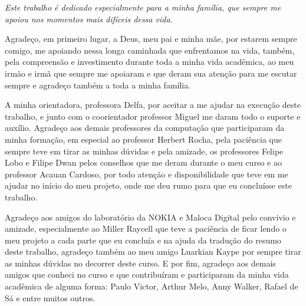 \documentclass[
	12pt,				%
    oneside,			%
	a4paper,			%
	chapter=TITLE,		%
	english,			%
	brazil				%
	]{abntex2}
\begin{document}
\frenchspacing 


\imprimircapa

\imprimirfolhaderosto

\imprimirfolhadeaprovacao
\begin{dedicatoria}
   \vspace*{\fill}
   \centering
   \noindent
   \textit{Este trabalho é dedicado especialmente para a minha família, que sempre me apoiou nos momentos mais difíceis dessa vida.} \vspace*{\fill}
\end{dedicatoria}

\begin{agradecimentos}
Agradeço, em primeiro lugar, a Deus, meu pai e minha mãe, por estarem sempre comigo, me apoiando nessa longa caminhada que enfrentamos na vida, também, pela compreensão e investimento durante toda a minha vida acadêmica, ao meu irmão e irmã que sempre me apoiaram e que deram sua atenção para me escutar sempre e agradeço também a toda a minha família.
\par
A minha orientadora, professora Delfa, por aceitar a me ajudar na execução deste trabalho, e junto com o coorientador professor Miguel me daram todo o suporte e auxílio. Agradeço aos demais professores da computação que participaram da minha formação, em especial ao professor Herbert Rocha, pela paciência que sempre teve em tirar as minhas dúvidas e pela amizade, os professores Felipe Lobo e Filipe Dwan pelos conselhos que me deram durante o meu curso e ao professor Acauan Cardoso, por todo atenção e disponibilidade que teve em me ajudar no início do meu projeto, onde me deu rumo para que eu concluísse este trabalho.
\par
Agradeço aos amigos do laboratório da NOKIA e Maloca Digital pelo convivio e amizade, especialmente ao Miller Raycell que teve a paciência de ficar lendo o meu projeto a cada parte que eu concluía e na ajuda da tradução do resumo deste trabalho, agradeço também ao meu amigo Luarkian Kaype por sempre tirar as minhas dúvidas no decorrer deste curso. E por fim, agradeço aos demais amigos que conheci no curso e que contribuíram e participaram da minha vida acadêmica de alguma forma: Paulo Victor, Arthur Melo, Anny Walker, Rafael de Sá e entre muitos outros.




\end{agradecimentos}
\end{document}
